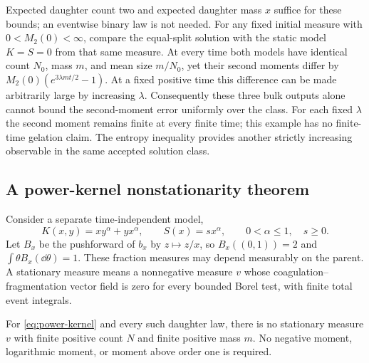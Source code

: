 Expected daughter count two and expected daughter mass $x$ suffice for
these bounds; an eventwise binary law is not needed. For any fixed initial
measure with $0<M_2(0)<\infty$, compare the equal-split solution with the
static model $K=S=0$ from that same measure. At every time both models have
identical count $N_0$, mass $m$, and mean size $m/N_0$, yet their second
moments differ by
$M_2(0)(e^{3\lambda mt/2}-1)$. At a fixed positive time this difference
can be made arbitrarily large by increasing $\lambda$. Consequently these
three bulk outputs alone cannot bound the second-moment error uniformly
over the class. For each fixed $\lambda$ the second moment remains finite
at every finite time; this example has no finite-time gelation claim.
The entropy inequality provides another strictly increasing observable in
the same accepted solution class.

\subsection{A power-kernel nonstationarity theorem}

Consider a separate time-independent model,
\begin{equation}
 K(x,y)=xy^\alpha+yx^\alpha,\qquad S(x)=s x^\alpha,
 \qquad 0<\alpha\leq1,\quad s\geq0.
 \label{eq:power-kernel}
\end{equation}
Let $B_x$ be the pushforward of $b_x$ by $z\mapsto z/x$, so
$B_x((0,1))=2$ and $\int\theta B_x(\dd\theta)=1$. These fraction measures
may depend measurably on the parent. A stationary measure means a
nonnegative measure $v$ whose coagulation--fragmentation vector field is
zero for every bounded Borel test, with finite total event integrals.

\begin{theorem}
\label{thm:power-no-equilibrium}
For \eqref{eq:power-kernel} and every such daughter law, there is no
stationary measure $v$ with finite positive count $N$ and finite positive
mass $m$. No negative moment, logarithmic moment, or moment above order
one is required.
\end{theorem}

